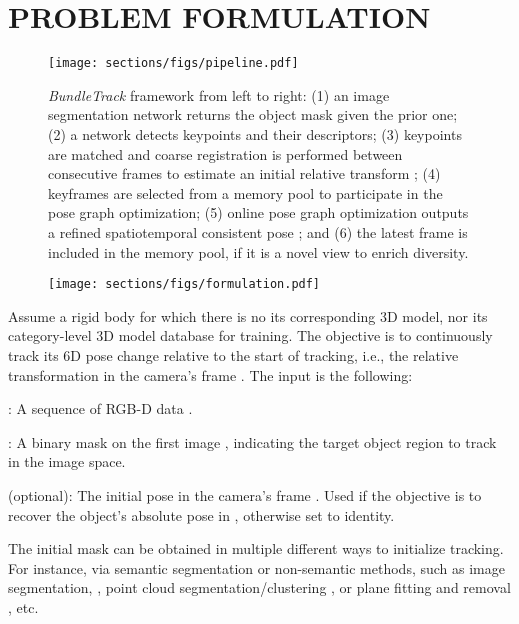 \documentclass[letterpaper, 10 pt, conference]{ieeeconf}
\newenvironment{myitem}{\begin{list}{}
{\setlength{\itemsep}{-0pt}
\setlength{\topsep}{0pt}
\setlength{\labelwidth}{5pt}
\setlength{\leftmargin}{10pt}
\setlength{\parsep}{-0pt}
\setlength{\itemsep}{0pt}
\setlength{\partopsep}{0pt}}}{\end{list}}
\begin{document}
 
\section{PROBLEM FORMULATION}
\begin{figure*}[h!]
  \centering
  \vspace{+0.05in}
  \texttt{[image: sections/figs/pipeline.pdf]}
  \vspace{-0.25in}\caption{\textit{BundleTrack} framework from left to right: (1) an image segmentation network returns the object mask given the prior one; (2) a network detects keypoints and their descriptors; (3) keypoints are matched and coarse registration is performed between consecutive frames to estimate an initial relative transform ; (4) keyframes are selected from a memory pool to participate in the pose graph optimization; (5) online pose graph optimization outputs a refined spatiotemporal consistent pose ; and (6) the latest frame is included in the memory pool, if it is a novel view to enrich diversity.}
  \label{fig:pipeline}
  \vspace{-0.2in}
\end{figure*}

\setlength{\columnsep}{0.1in}\setlength{\intextsep}{0.03in}\begin{wrapfigure}{r}{1.9in}
\vspace{-.1in}
  \centering
  \texttt{[image: sections/figs/formulation.pdf]}  
\end{wrapfigure}

Assume a rigid body for which there is no its corresponding 3D model, nor its category-level 3D model database for training. The objective is to continuously track its 6D pose change relative to the start of tracking, i.e., the relative transformation  in the camera's frame . The input is the following:

\begin{myitem}
  \item : A sequence of RGB-D data .
  \item : A binary mask on the first image , indicating the target object region to track in the image space. 
  \item  (optional):  The initial pose in the camera's frame . Used if the objective is to recover the object's absolute pose in , otherwise set to identity.
\end{myitem}
    
\noindent The initial mask  can be obtained in multiple different ways to initialize tracking. For instance, via semantic segmentation  \cite{long2015fully,chen2017deeplab,le2018deep} or non-semantic methods, such as image segmentation, \cite{meyer1992color,danielczuk2019segmenting,xiang2020learning}, point cloud segmentation/clustering \cite{rusu20113d,Papon13CVPR}, or plane fitting and removal \cite{rusu20113d}, etc.
    
\end{document}
